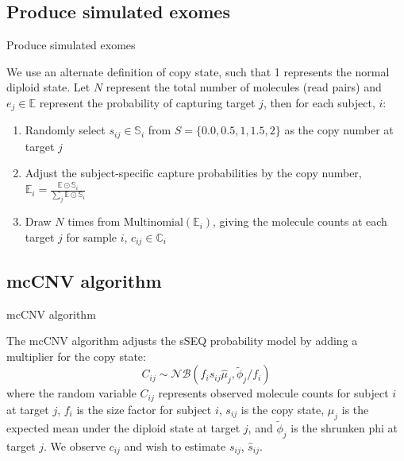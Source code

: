 \documentclass[
  10pt,
  ignorenonframetext,
  m]{beamer}
\begin{document}
\hypertarget{produce-simulated-exomes}{%
\subsection{Produce simulated exomes}\label{produce-simulated-exomes}}

\begin{frame}{Produce simulated exomes}

\medskip

We use an alternate definition of copy state, such that 1 represents the
normal diploid state. Let \(N\) represent the total number of molecules
(read pairs) and \(e_j \in \mathbb{E}\) represent the probability of
capturing target \(j\), then for each subject, \(i\):

\begin{enumerate}
\item
  Randomly select \(s_{ij} \in \mathbb{S}_i\) from
  \(S = \{0.0, 0.5, 1, 1.5, 2\}\) as the copy number at target \(j\)
\item
  Adjust the subject-specific capture probabilities by the copy number,
  \(\mathbb{E}_i = \frac{\mathbb{E} \odot \mathbb{S}_{i}}{\sum_j \mathbb{E} \odot \mathbb{S}_{i}}\)
\item
  Draw \(N\) times from \(\text{Multinomial}(\mathbb{E}_i)\), giving the
  molecule counts at each target \(j\) for sample \(i\),
  \(c_{ij} \in \mathbb{C}_i\)
\end{enumerate}

\end{frame}

\hypertarget{mccnv-algorithm-1}{%
\subsection{mcCNV algorithm}\label{mccnv-algorithm-1}}

\begin{frame}{mcCNV algorithm}

The mcCNV algorithm adjusts the sSEQ probability model by adding a
multiplier for the copy state: \[
  C_{ij} \sim \mathcal{NB}(f_is_{ij}\hat\mu_j, \tilde\phi_j/f_i)
\] where the random variable \(C_{ij}\) represents observed molecule
counts for subject \(i\) at target \(j\), \(f_i\) is the size factor for
subject \(i\), \(s_{ij}\) is the copy state, \(\mu_j\) is the expected
mean under the diploid state at target \(j\), and \(\tilde\phi_j\) is
the shrunken phi at target \(j\). We observe \(c_{ij}\) and wish to
estimate \(s_{ij}\), \(\hat{s}_{ij}\).

\end{frame}
\end{document}

